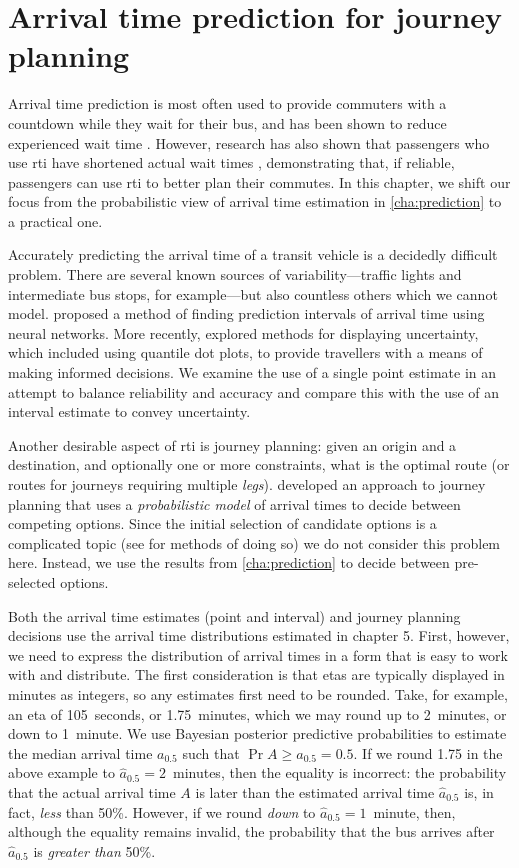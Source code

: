
\chapter{Arrival time prediction for journey planning}
\label{cha:etas}
Arrival time prediction is most often used to provide commuters with a countdown while they wait for their bus, and has been shown to reduce experienced wait time \citep{TCRP_2003}. However, research has also shown that passengers who use \gls{rti} have shortened actual wait times \citep{Lu_2017}, demonstrating that, if reliable, passengers can use \gls{rti} to better plan their commutes. In this chapter, we shift our focus from the probabilistic view of arrival time estimation in \cref{cha:prediction} to a practical one.


Accurately predicting the arrival time of a transit vehicle is a decidedly difficult problem. There are several known sources of variability---traffic lights and intermediate bus stops, for example---but also countless others which we cannot model. \citet{Mazloumi_2011} proposed a method of finding prediction intervals of arrival time using neural networks. More recently, \citet{Fernandes_2018} explored methods for displaying uncertainty, which included using quantile dot plots, to provide travellers with a means of making informed decisions. We examine the use of a single point estimate in an attempt to balance reliability and accuracy and compare this with the use of an interval estimate to convey uncertainty.


Another desirable aspect of \gls{rti} is journey planning: given an origin and a destination, and optionally one or more constraints, what is the optimal route (or routes for journeys requiring multiple \emph{legs}).  developed an approach to journey planning that uses a \emph{probabilistic model} of arrival times to decide between competing options. Since the initial selection of candidate options is a complicated topic (see \citet{Hame_2013a,Hame_2013b,Zheng_2016} for methods of doing so) we do not consider this problem here. Instead, we use the results from \cref{cha:prediction} to decide between pre-selected options.


Both the arrival time estimates (point and interval) and journey planning decisions use the arrival time distributions estimated in chapter 5. First, however, we need to express the distribution of arrival times in a form that is easy to work with and distribute. The first consideration is that \glspl{eta} are typically displayed in minutes as integers, so any estimates first need to be rounded. Take, for example, an \gls{eta} of 105~seconds, or 1.75~minutes, which we may round up to 2~minutes, or down to 1~minute. We use Bayesian posterior predictive probabilities to estimate the median arrival time $a_{0.5}$ such that $\Pr{A \geq a_{0.5}} = 0.5$. If we round 1.75 in the above example to $\hat a_{0.5} = 2$~minutes, then the equality is incorrect: the probability that the actual arrival time $A$ is later than the estimated arrival time $\hat a_{0.5}$ is, in fact, \emph{less} than 50\%. However, if we round \emph{down} to $\hat a_{0.5} = 1$~minute, then, although the equality remains invalid, the probability that the bus arrives after $\hat a_{0.5}$ is \emph{greater than} 50\%.


